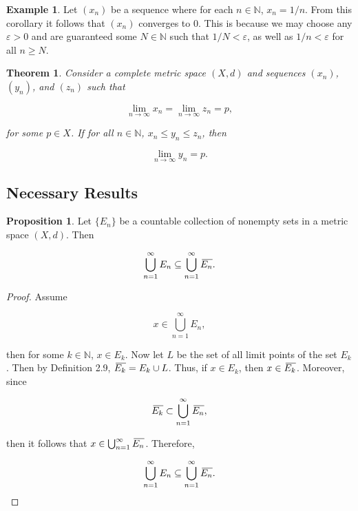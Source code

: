 \documentclass{article}
\newtheorem{theorem}{Theorem}[section]
\theoremstyle{definition}
\newtheorem{prop}{Proposition}[section]
\theoremstyle{remark}
\newcommand{\closure}[2][3]{%
  {}\mkern#1mu\overline{\mkern-#1mu#2}}
\theoremstyle{definition}
\newtheorem{example}{Example}[section]
\begin{document}
\begin{example}
    Let $(x_n)$ be a sequence where for each $n\in\mathbb{N}$, $x_n=1/n$. From this corollary it follows that $(x_n)$ converges to 0. This is because we may choose any $\varepsilon>0$ and are guaranteed some $N\in\mathbb{N}$ such that $1/N<\varepsilon$, as well as $1/n<\varepsilon$ for all $n\geq N$.
\end{example}

\begin{theorem}
    Consider a complete metric space $(X,d)$ and sequences $(x_n)$, $(y_n)$, and $(z_n)$ such that 
    
    \begin{equation*}
        \lim_{n\rightarrow\infty}x_n=\lim_{n\rightarrow\infty}z_n=p,
    \end{equation*}
    
    \noindent for some $p\in X$. If for all $n\in\mathbb{N}$, $x_n\leq y_n\leq z_n$, then 
    
    \begin{equation*}
        \lim_{n\rightarrow\infty}y_n=p.
    \end{equation*}
\end{theorem}

\newpage

\subsection{Necessary Results}

\begin{prop}
    Let $\{E_n\}$ be a countable collection of nonempty sets in a metric space $(X,d)$. Then 
    
    \begin{equation*}
        \bigcup_{n=1}^{\infty} E_n\subseteq\bigcup_{n=1}^{\infty}\closure{E_n}.
    \end{equation*}
\end{prop}

\begin{proof}
    Assume 
    
    \begin{equation*}
        x\in\bigcup_{n=1}^{\infty} E_n,
    \end{equation*}
    
    \noindent then for some $k\in\mathbb{N}$, $x\in E_k$. Now let $L$ be the set of all limit points of the set $E_k$. Then by Definition 2.9, $\closure{E_k}= E_k\cup L$. Thus, if $x\in E_k$, then $x\in\closure{E_k}$. Moreover, since 
    
    \begin{equation*}
        \closure{E_k}\subset\bigcup_{n=1}^{\infty}\closure{E_n},
    \end{equation*}
    
    \noindent then it follows that $x\in\bigcup_{n=1}^{\infty}\closure{E_n}$. Therefore, 
    
    \begin{equation*}
        \bigcup_{n=1}^{\infty} E_n\subseteq\bigcup_{n=1}^{\infty}\closure{E_n}.
    \end{equation*}
\end{proof}
\end{document}
